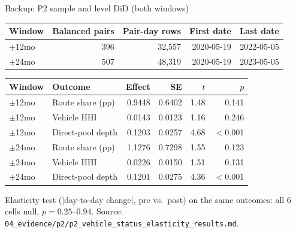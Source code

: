 \documentclass[aspectratio=169]{beamer}
\begin{document}
\begin{frame}{Backup: P2 sample and level DiD (both windows)}
  \footnotesize
  \begin{center}
  \begin{tabular}{@{}l r r r r@{}}
    \toprule
    Window & Balanced pairs & Pair-day rows & First date & Last date \\
    \midrule
    $\pm$12mo & 396 & 32{,}557 & 2020-05-19 & 2022-05-05 \\
    $\pm$24mo & 507 & 48{,}319 & 2020-05-19 & 2023-05-05 \\
    \bottomrule
  \end{tabular}
  \end{center}
  \vspace{0.6em}
  \begin{center}
  \begin{tabular}{@{}l l r r r r@{}}
    \toprule
    Window & Outcome & Effect & SE & $t$ & $p$ \\
    \midrule
    $\pm$12mo & Route share (pp) & 0.9448 & 0.6402 & 1.48 & 0.141 \\
    $\pm$12mo & Vehicle HHI & 0.0143 & 0.0123 & 1.16 & 0.246 \\
    $\pm$12mo & Direct-pool depth & 0.1203 & 0.0257 & 4.68 & $<$0.001 \\
    $\pm$24mo & Route share (pp) & 1.1276 & 0.7298 & 1.55 & 0.123 \\
    $\pm$24mo & Vehicle HHI & 0.0226 & 0.0150 & 1.51 & 0.131 \\
    $\pm$24mo & Direct-pool depth & 0.1201 & 0.0275 & 4.36 & $<$0.001 \\
    \bottomrule
  \end{tabular}
  \end{center}
  {\scriptsize Elasticity test ($|$day-to-day change$|$, pre vs.\ post) on the same outcomes: all 6 cells null, $p=0.25$--$0.94$. Source: \texttt{04\_evidence/p2/p2\_vehicle\_status\_elasticity\_results.md}.}
\end{frame}
\end{document}
